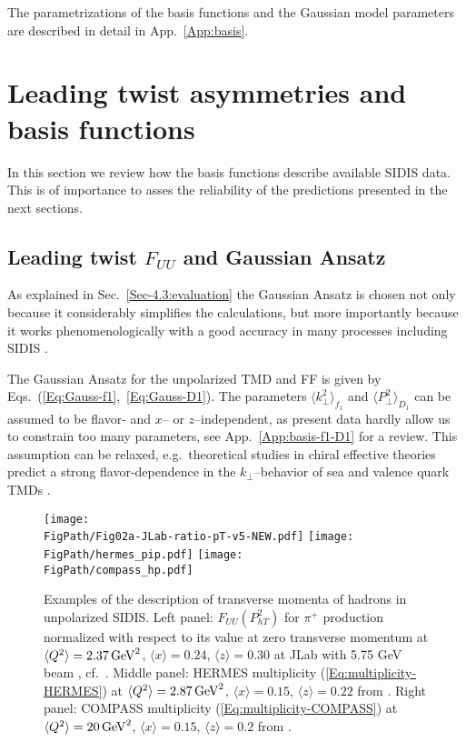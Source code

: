 \documentclass[a4paper,11pt]{article}
\newcommand{\la}{\langle}
\newcommand{\ra}{\rangle}
\def\kperp{k_\perp}
\def\pperp{P_\perp}
\def\avkperp{\la \kperp^2 \ra}
\def\avpperp{\la \pperp^2 \ra}
\newcommand*{\FigPath}{./figs}%
\begin{document}
The parametrizations of the basis functions and the Gaussian model
parameters are described in detail in App.~\ref{App:basis}.




\section{Leading twist asymmetries and basis functions}
\label{Sec-5:twist-2+basis}
In this section we review how the basis functions describe available
SIDIS data. This is of importance to asses the reliability of the
predictions presented in the next sections.

\subsection{\boldmath Leading twist $F_{UU}$ and Gaussian Ansatz}
\label{Sec-5.1:FUU-basis}

As explained in Sec.~\ref{Sec-4.3:evaluation} the Gaussian Ansatz is chosen
not only because it considerably simplifies the calculations, but more 
importantly because it works phenomenologically with a good accuracy 
in many processes including SIDIS
\cite{Anselmino:2005nn,Collins:2005ie,D'Alesio:2007jt,Schweitzer:2010tt,
Signori:2013mda,Anselmino:2013lza}.

The Gaussian Ansatz for the unpolarized TMD and FF 
is given by Eqs.~(\ref{Eq:Gauss-f1},~\ref{Eq:Gauss-D1}).
The parameters $\avkperp_{f_1}$ and $\avpperp_{D_1}$ can be 
assumed to be flavor- and $x$-- or $z$--independent, as present
data hardly allow us to constrain too many parameters, see
App.~\ref{App:basis-f1-D1} for a review. This assumption can be
relaxed, e.g.\ theoretical studies in chiral effective theories 
predict a strong flavor-dependence in the $\kperp$--behavior
of sea and valence quark TMDs \cite{Schweitzer:2012hh}.

\begin{figure}[b!]
\centering
\texttt{[image: \\FigPath/Fig02a-JLab-ratio-pT-v5-NEW.pdf]}  \quad
\texttt{[image: \\FigPath/hermes\_pip.pdf]} \quad
\texttt{[image: \\FigPath/compass\_hp.pdf]} 
\caption{\label{FUU-show-pT-dependence}
Examples of the 
	description of transverse momenta of hadrons in unpolarized SIDIS. 
Left panel: 
	$F_{UU}(P_{hT}^2)$ for $\pi^+$ production normalized with 
	respect to its value at zero transverse momentum at 
	$\la Q^2\ra=2.37\,{\rm GeV}^2$, $\la x\ra=0.24$, $\la z\ra=0.30$ 
	at JLab with 5.75 GeV beam \cite{Osipenko:2008aa}, cf.\  
	\cite{Schweitzer:2010tt}.
Middle panel: 
	HERMES multiplicity (\ref{Eq:multiplicity-HERMES}) at 
	$\la Q^2\ra=2.87\,{\rm GeV}^2$, $\la x\ra  =0.15$, $\la z\ra  =0.22$
	from \cite{Airapetian:2012ki}.
Right panel: 
	COMPASS multiplicity (\ref{Eq:multiplicity-COMPASS}) at 
	$\la Q^2\ra=20\,{\rm GeV}^2$, $\la x\ra  =0.15$, $\la z\ra  =0.2$
	from \cite{Aghasyan:2017ctw}.}
\end{figure}
\end{document}
